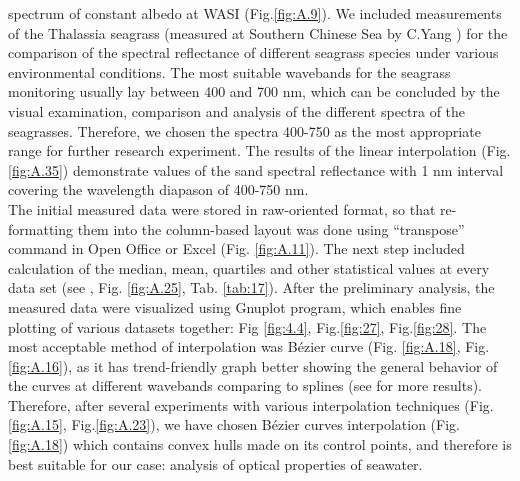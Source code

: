 \documentclass[10pt, a4paper]{article}
\begin{document}
spectrum of constant albedo at WASI (Fig.\ref{fig:A.9}). 
We included measurements of the Thalassia seagrass
(measured at Southern Chinese Sea by C.Yang \cite{Yang10} \label{Yang10}) for the comparison of the spectral reflectance of
different seagrass species under various environmental conditions.
The most suitable wavebands for the seagrass monitoring usually lay between 400 and 700 nm,
which can be concluded by the visual examination, comparison and analysis of the different spectra of
the seagrasses. Therefore, we chosen the spectra 400-750 as the most appropriate range for
further research experiment. The results of the linear interpolation (Fig.\ref{fig:A.35}) demonstrate values of the
sand spectral reflectance with 1 nm interval covering the wavelength diapason of 400-750 nm.\\
The initial measured data were stored in raw-oriented format, so that re-formatting them into the
column-based layout was done using “transpose” command in Open Office or Excel (Fig. \ref{fig:A.11}). The next step included
calculation of the median, mean, quartiles and other statistical values at every data set (see , Fig. \ref{fig:A.25}, Tab. \ref{tab:17}).
After the preliminary analysis, the measured data were visualized using Gnuplot program, which
enables fine plotting of various datasets together: Fig \ref{fig:4.4}, Fig.\ref{fig:27}, Fig.\ref{fig:28}. The most acceptable method of interpolation was B\'ezier curve (Fig. \ref{fig:A.18}, Fig. \ref{fig:A.16}),
as it has trend-friendly graph better showing the general behavior of the curves at different wavebands
comparing to splines (see  for more results). 
Therefore, after several experiments with
various interpolation techniques (Fig.\ref{fig:A.15}, Fig.\ref{fig:A.23}), we have chosen B\'ezier curves interpolation (Fig.\ref{fig:A.18}) which contains convex
hulls made on its control points, and therefore is best suitable for our case: analysis of optical
properties of seawater.
\end{document}

